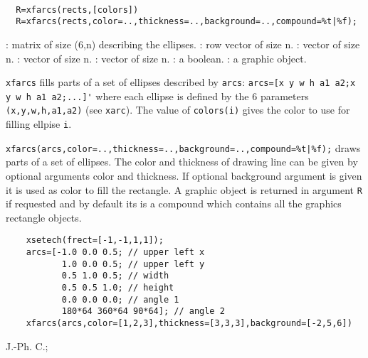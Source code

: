 
\begin{mandesc}
  \\ %
\end{mandesc}
\begin{calling_sequence}
\begin{verbatim}
  R=xfarcs(rects,[colors])
  R=xfarcs(rects,color=..,thickness=..,background=..,compound=%t|%f);
\end{verbatim}
\end{calling_sequence}

\begin{parameters}
  \begin{varlist}
    : matrix of size (6,n) describing the ellipses.
    : row vector of size n.
    : vector of size n.
    : vector of size n.
    : vector of size n.
    : a boolean.
    : a graphic object.
  \end{varlist}
\end{parameters}

\begin{mandescription}
  \verb!xfarcs! fills parts of a set of ellipses described by \verb!arcs!: 
  \verb!arcs=[x y w h a1 a2;x y w h a1 a2;...]'! where each ellipse is defined 
  by the 6 parameters \verb!(x,y,w,h,a1,a2)! (see \verb!xarc!).
  The value of \verb!colors(i)! gives the color to use for filling ellpise \verb!i!.

  \verb!xfarcs(arcs,color=..,thickness=..,background=..,compound=%t|%f);! 
  draws parts of a set of ellipses. The color and thickness of drawing line can be given by optional arguments
  color and thickness. If optional background argument is given it is used as color to fill
  the rectangle. A graphic object is returned in argument \verb!R! if requested and by default
  its is a compound which contains all the graphics rectangle objects.
\end{mandescription}

\begin{examples}
  \begin{Verbatim}
    xsetech(frect=[-1,-1,1,1]);
    arcs=[-1.0 0.0 0.5; // upper left x
           1.0 0.0 0.5; // upper left y
           0.5 1.0 0.5; // width
           0.5 0.5 1.0; // height
           0.0 0.0 0.0; // angle 1
           180*64 360*64 90*64]; // angle 2
    xfarcs(arcs,color=[1,2,3],thickness=[3,3,3],background=[-2,5,6])
  \end{Verbatim}
\end{examples}

\begin{manseealso}
     
\end{manseealso}


\begin{authors}
  J.-Ph. C.;   
\end{authors}

